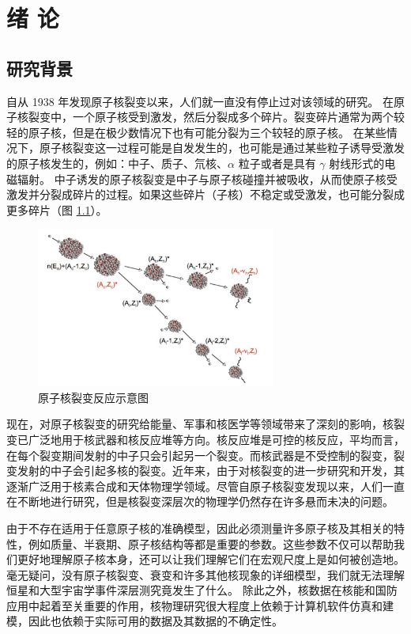 \documentclass[AutoFakeBold]{LZUThesis}
\begin{document}
\tableofcontents
\thispagestyle{empty}


\mainmatter

\chapter{绪 \qquad 论}
\section{研究背景}
自从 1938 年发现原子核裂变以来\cite{meitner1939disintegration}，人们就一直没有停止过对该领域的研究。
在原子核裂变中，一个原子核受到激发，然后分裂成多个碎片。裂变碎片通常为两个较轻的原子核，但是在极少数情况下也有可能分裂为三个较轻的原子核\cite{vijayaraghavan2014collinear}。
在某些情况下，原子核裂变这一过程可能是自发发生的，也可能是通过某些粒子诱导受激发的原子核发生的，例如：中子、质子、氘核、$\alpha$ 粒子或者是具有 $\gamma$ 射线形式的电磁辐射。
中子诱发的原子核裂变是中子与原子核碰撞并被吸收，从而使原子核受激发并分裂成碎片的过程。如果这些碎片（子核）不稳定或受激发，也可能分裂成更多碎片（图 \ref{fig_nuclear_fission}）。 

\begin{figure}[H]
    \centering
    \includegraphics[width=0.7\textwidth]{figures/nuclear_fission.png}
    \caption{原子核裂变反应示意图\cite{kovacs1970angular}}
    \label{fig_nuclear_fission}
\end{figure}

现在，对原子核裂变的研究给能量、军事和核医学等领域带来了深刻的影响，核裂变已广泛地用于核武器和核反应堆等方向。核反应堆是可控的核反应，平均而言，在每个裂变期间发射的中子只会引起另一个裂变。而核武器是不受控制的裂变，裂变发射的中子会引起多核的裂变。近年来，由于对核裂变的进一步研究和开发，其逐渐广泛用于核素合成和天体物理学领域。尽管自原子核裂变发现以来，人们一直在不断地进行研究，但是核裂变深层次的物理学仍然存在许多悬而未决的问题。


由于不存在适用于任意原子核的准确模型，因此必须测量许多原子核及其相关的特性，例如质量、半衰期、原子核结构等都是重要的参数。这些参数不仅可以帮助我们更好地理解原子核本身，还可以让我们理解它们在宏观尺度上是如何被创造地。毫无疑问，没有原子核裂变、衰变和许多其他核现象的详细模型，我们就无法理解恒星和大型宇宙学事件深层测究竟发生了什么。
除此之外，核数据在核能和国防应用中起着至关重要的作用，核物理研究很大程度上依赖于计算机软件仿真和建模，因此也依赖于实际可用的数据及其数据的不确定性。
\end{document}
